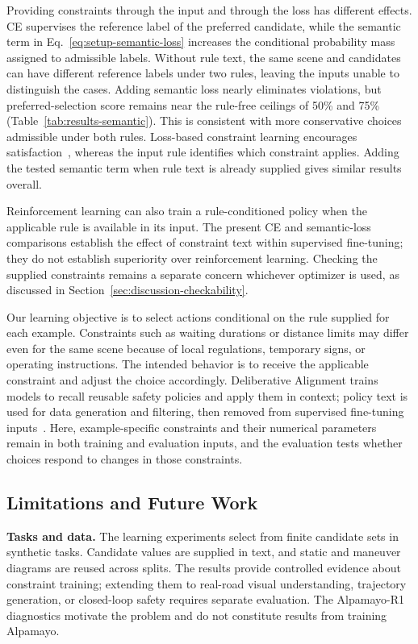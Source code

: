 Providing constraints through the input and through the loss has different
effects. CE supervises the reference label of the preferred candidate, while the semantic term in
Eq.~\ref{eq:setup-semantic-loss} increases the conditional probability mass
assigned to admissible labels. Without rule text, the same scene and candidates
can have different reference labels under two rules, leaving the inputs
unable to distinguish the cases. Adding semantic loss nearly eliminates
violations, but preferred-selection score remains near the rule-free ceilings of 50\% and
75\% (Table~\ref{tab:results-semantic}). This is consistent with more
conservative choices admissible under both rules. Loss-based constraint
learning encourages satisfaction~\cite{Xu2018,Giunchiglia2022}, whereas the
input rule identifies which constraint applies. Adding the tested semantic
term when rule text is already supplied gives similar results overall.

Reinforcement learning can also train a rule-conditioned policy when the
applicable rule is available in its input. The present CE and semantic-loss
comparisons establish the effect of constraint text within supervised
fine-tuning; they do not establish superiority over reinforcement learning.
Checking the supplied constraints remains a separate concern whichever
optimizer is used, as discussed in Section~\ref{sec:discussion-checkability}.

Our learning objective is to select actions conditional on the rule supplied
for each example. Constraints such as waiting durations or distance limits
may differ even for the same scene because of local regulations, temporary
signs, or operating instructions. The intended behavior is to receive the
applicable constraint and adjust the choice accordingly. Deliberative Alignment
trains models to recall reusable safety policies and apply them in context;
policy text is used for data generation and filtering, then removed from
supervised fine-tuning inputs~\cite{Guan2024}. Here, example-specific constraints and their numerical
parameters remain in both training and evaluation inputs, and the evaluation
tests whether choices respond to changes in those constraints.

\subsection{Limitations and Future Work}\label{sec:discussion-limitations}

\noindent\textbf{Tasks and data.}
The learning experiments select from finite candidate sets in synthetic tasks.
Candidate values are supplied in text, and static and maneuver diagrams are
reused across splits. The results provide controlled evidence about constraint
training; extending them to real-road visual understanding, trajectory
generation, or closed-loop safety requires separate evaluation. The Alpamayo-R1
diagnostics motivate the problem and do not constitute results from training
Alpamayo.

